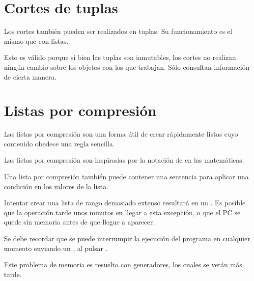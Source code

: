 
\section{Cortes de tuplas}

Los cortes también pueden ser realizados en tuplas.
Su funcionamiento es el mismo que con listas.


Esto es válido porque si bien las tuplas son inmutables, los cortes no realizan ningún cambio sobre los objetos con los que trabajan.
Sólo consultan información de cierta manera.

\section{Listas por compresión}

Las listas por compresión son una forma útil de crear rápidamente listas cuyo contenido obedece una regla sencilla.


Las listas por compresión son inspiradas por la notación de  en las matemáticas.

Una lista por compresión también puede contener una sentencia  para aplicar una condición en los valores de la lista.


Intentar crear una lista de rango demasiado extenso resultará en un .
Es posible que la operación tarde unos minutos en llegar a esta excepción, o que el PC se quede sin memoria antes de que llegue a aparecer.


Se debe recordar que se puede interrumpir la ejecución del programa en cualquier momento enviando un , al pulsar .

Este problema de memoria es resuelto con generadores, los cuales se verán más tarde.

